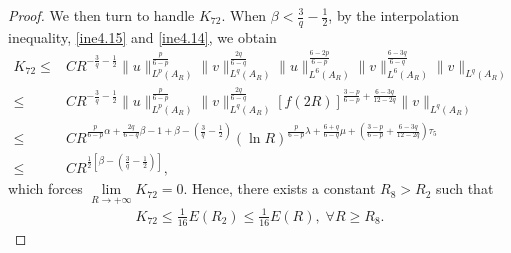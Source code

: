 \documentclass[11pt,reqno]{amsart}
\numberwithin{Thm}{section}
\begin{document}
\begin{proof}
We then turn to handle $K_{72}$.
When $\beta<\frac{3}{q}-\frac{1}{2}$, by the interpolation inequality, \eqref{ine4.15} and \eqref{ine4.14}, we obtain
\begin{align*}
	K_{72} \leq& C R^{-\frac{3}{q}-\frac{1}{2}} \|u\|_{L^p(A_R)}^{\frac{p}{6-p}}\|v\|_{L^q(A_R)}^{\frac{2q}{6-q}} \|u\|_{L^6(A_R)}^{\frac{6-2p}{6-p}}\|v\|_{L^6(A_R)}^{\frac{6-3q}{6-q}}  \|v\|_{L^q(A_R)}\\
 \leq&C R^{-\frac{3}{q}-\frac{1}{2}}\|u\|_{L^p(A_R)}^{\frac{p}{6-p}}\|v\|_{L^q(A_R)}^{\frac{2q}{6-q}}\left[f(2R)\right]^{\frac{3-p}{6-p}+\frac{6-3q}{12-2q}}\|v\|_{L^q(A_R)}\\
 \leq&C R^{\frac{p}{6-p}\alpha+\frac{2q}{6-q}\beta-1+\beta-\left(\frac{3}{q}-\frac{1}{2}\right)}(\ln R)^{\frac{p}{6-p}\lambda+\frac{6+q}{6-q}\mu+\left(\frac{3-p}{6-p}+\frac{6-3q}{12-2q}\right)\tau_5}\\
 \leq&C R^{\frac{1}{2}\left[\beta-\left(\frac{3}{q}-\frac{1}{2}\right)\right]},
\end{align*}
which forces $\lim\limits_{R\rightarrow+\infty}K_{72}=0$. Hence, there exists a constant $R_8>R_2$ such that
\begin{align}\label{ine4.45}
K_{72}\leq\frac{1}{16}E(R_2)\leq \frac{1}{16}E(R),\;\forall R\geq R_8.
\end{align}



\end{proof}
\end{document}
